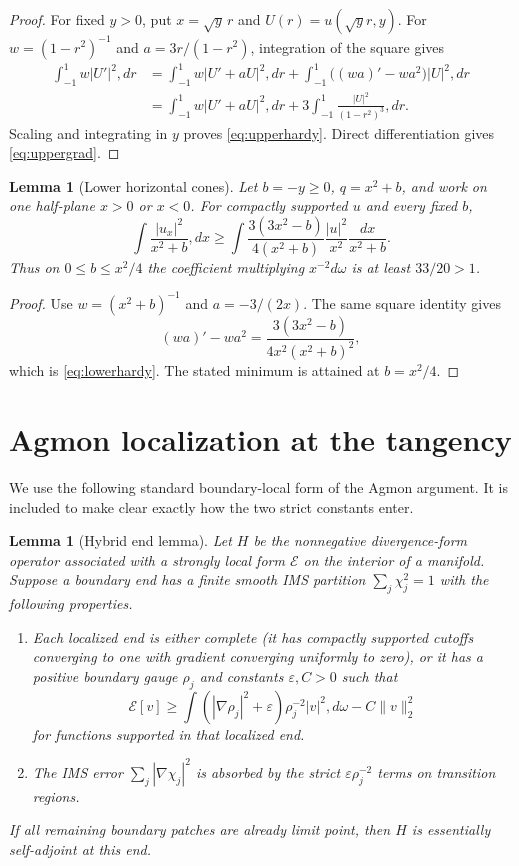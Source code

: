 \documentclass[11pt]{article}
\newtheorem{lemma}[theorem]{Lemma}
\newcommand{\cE}{\mathcal E}
\begin{document}
\begin{proof}
For fixed $y>0$, put $x=\sqrt y\,r$ and $U(r)=u(\sqrt y r,y)$.
For $w=(1-r^2)^{-1}$ and $a=3r/(1-r^2)$, integration of the square gives
\begin{align*}
 \int_{-1}^1w|U'|^2,dr
 &=\int_{-1}^1w|U'+aU|^2,dr
   +\int_{-1}^1\bigl((wa)'-wa^2\bigr)|U|^2,dr\\
 &=\int_{-1}^1w|U'+aU|^2,dr
   +3\int_{-1}^1\frac{|U|^2}{(1-r^2)^3},dr.
\end{align*}
Scaling and integrating in $y$ proves \eqref{eq:upperhardy}.  Direct
differentiation gives \eqref{eq:uppergrad}.
\end{proof}

\begin{lemma}[Lower horizontal cones]\label{lem:lower}
Let $b=-y\ge0$, $q=x^2+b$, and work on one half-plane $x>0$ or $x<0$.
For compactly supported $u$ and every fixed $b$,
\begin{equation}\label{eq:lowerhardy}
 \int\frac{|u_x|^2}{x^2+b},dx
 \ge\int \frac{3(3x^2-b)}{4(x^2+b)}
              \frac{|u|^2}{x^2}\frac{dx}{x^2+b}.
\end{equation}
Thus on $0\le b\le x^2/4$ the coefficient multiplying
$x^{-2}d\omega$ is at least $33/20>1$.
\end{lemma}

\begin{proof}
Use $w=(x^2+b)^{-1}$ and $a=-3/(2x)$.  The same square identity gives
\[
 (wa)'-wa^2
 =\frac{3(3x^2-b)}{4x^2(x^2+b)^2},
\]
which is \eqref{eq:lowerhardy}.  The stated minimum is attained at
$b=x^2/4$.
\end{proof}

\section{Agmon localization at the tangency}

We use the following standard boundary-local form of the Agmon argument.
It is included to make clear exactly how the two strict constants enter.

\begin{lemma}[Hybrid end lemma]\label{lem:agmon}
Let $H$ be the nonnegative divergence-form operator associated with a
strongly local form $\cE$ on the interior of a manifold.  Suppose a boundary
end has a finite smooth IMS partition $\sum_j\chi_j^2=1$ with the following
properties.
\begin{enumerate}
\item Each localized end is either complete (it has compactly supported
cutoffs converging to one with gradient converging uniformly to zero), or it
has a positive boundary gauge $\rho_j$ and constants $\varepsilon,C>0$ such
that
\[
 \cE[v]\ge\int
 (|\nabla\rho_j|^2+\varepsilon)\rho_j^{-2}|v|^2,d\omega-C\|v\|_2^2
\]
for functions supported in that localized end.
\item The IMS error $\sum_j|\nabla\chi_j|^2$ is absorbed by the strict
$\varepsilon\rho_j^{-2}$ terms on transition regions.
\end{enumerate}
If all remaining boundary patches are already limit point, then $H$ is
essentially self-adjoint at this end.
\end{lemma}
\end{document}
